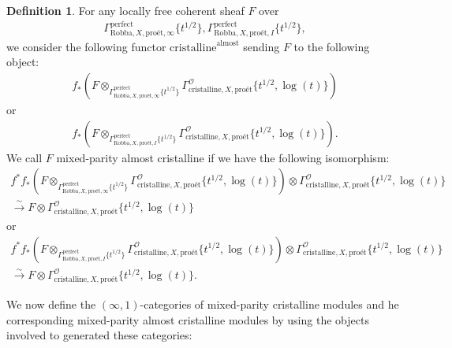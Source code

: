 \documentclass[12pt]{book}
\theoremstyle{definition}
\newtheorem{definition}{Definition}
\begin{document}
\begin{definition}
For any locally free coherent sheaf $F$ over
\begin{align}
\Gamma^\mathrm{perfect}_{\text{Robba},X,\text{pro\'et},\infty}\{t^{1/2}\},\Gamma^\mathrm{perfect}_{\text{Robba},X,\text{pro\'et},I}\{t^{1/2}\},
\end{align} 
we consider the following functor $\mathrm{cristalline}^\mathrm{almost}$ sending $F$ to the following object:
\begin{align}
f_*(F\otimes_{\Gamma^\mathrm{perfect}_{\text{Robba},X,\text{pro\'et},\infty}\{t^{1/2}\}} \Gamma^\mathcal{O}_{\text{cristalline},X,\text{pro\'et}}\{t^{1/2},\log(t)\})
\end{align}
or 
\begin{align}
f_*(F\otimes_{\Gamma^\mathrm{perfect}_{\text{Robba},X,\text{pro\'et},I}\{t^{1/2}\}} \Gamma^\mathcal{O}_{\text{cristalline},X,\text{pro\'et}}\{t^{1/2},\log(t)\}).
\end{align}
We call $F$ mixed-parity almost cristalline if we have the following isomorphism:
\begin{align}
f^*f_*(F\otimes_{\Gamma^\mathrm{perfect}_{\text{Robba},X,\text{pro\'et},\infty}\{t^{1/2}\}} \Gamma^\mathcal{O}_{\text{cristalline},X,\text{pro\'et}}\{t^{1/2},\log(t)\}) \otimes \Gamma^\mathcal{O}_{\text{cristalline},X,\text{pro\'et}}\{t^{1/2},\log(t)\} \\
\overset{\sim}{\longrightarrow} F \otimes \Gamma^\mathcal{O}_{\text{cristalline},X,\text{pro\'et}}\{t^{1/2},\log(t)\} 
\end{align}
or 
\begin{align}
f^*f_*(F\otimes_{\Gamma^\mathrm{perfect}_{\text{Robba},X,\text{pro\'et},I}\{t^{1/2}\}} \Gamma^\mathcal{O}_{\text{cristalline},X,\text{pro\'et}}\{t^{1/2},\log(t)\}) \otimes \Gamma^\mathcal{O}_{\text{cristalline},X,\text{pro\'et}}\{t^{1/2},\log(t)\}\\ \overset{\sim}{\longrightarrow} F \otimes \Gamma^\mathcal{O}_{\text{cristalline},X,\text{pro\'et}}\{t^{1/2},\log(t)\}. 
\end{align}
\end{definition}

\noindent We now define the $(\infty,1)$-categories of mixed-parity cristalline modules and he corresponding mixed-parity almost cristalline modules by using the objects involved to generated these categories:
\end{document}
